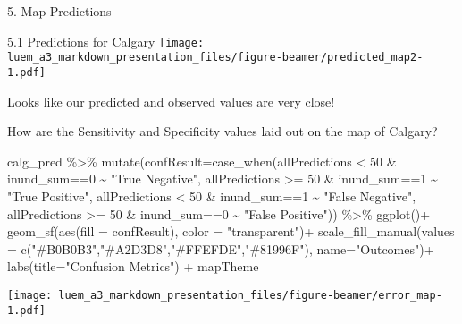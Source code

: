 \documentclass[
  ignorenonframetext,
]{beamer}
\newenvironment{Shaded}{\begin{snugshade}}{\end{snugshade}}
\newcommand{\AttributeTok}[1]{\textcolor[rgb]{0.77,0.63,0.00}{#1}}
\newcommand{\DecValTok}[1]{\textcolor[rgb]{0.00,0.00,0.81}{#1}}
\newcommand{\FunctionTok}[1]{\textcolor[rgb]{0.00,0.00,0.00}{#1}}
\newcommand{\NormalTok}[1]{#1}
\newcommand{\SpecialCharTok}[1]{\textcolor[rgb]{0.00,0.00,0.00}{#1}}
\newcommand{\StringTok}[1]{\textcolor[rgb]{0.31,0.60,0.02}{#1}}
\begin{document}
\begin{frame}[fragile]{5. Map Predictions}
\begin{block}{5.1 Predictions for Calgary}
\texttt{[image: luem\_a3\_markdown\_presentation\_files/figure-beamer/predicted\_map2-1.pdf]}

Looks like our predicted and observed values are very close!

How are the Sensitivity and Specificity values laid out on the map of
Calgary?

\begin{Shaded}
\begin{Highlighting}[]
\NormalTok{calg\_pred }\SpecialCharTok{\%\textgreater{}\%}
  \FunctionTok{mutate}\NormalTok{(}\AttributeTok{confResult=}\FunctionTok{case\_when}\NormalTok{(allPredictions }\SpecialCharTok{\textless{}} \DecValTok{50} \SpecialCharTok{\&}\NormalTok{ inund\_sum}\SpecialCharTok{==}\DecValTok{0} \SpecialCharTok{\textasciitilde{}} \StringTok{"True Negative"}\NormalTok{,}
\NormalTok{                              allPredictions }\SpecialCharTok{\textgreater{}=} \DecValTok{50} \SpecialCharTok{\&}\NormalTok{ inund\_sum}\SpecialCharTok{==}\DecValTok{1} \SpecialCharTok{\textasciitilde{}} \StringTok{"True Positive"}\NormalTok{,}
\NormalTok{                              allPredictions }\SpecialCharTok{\textless{}} \DecValTok{50} \SpecialCharTok{\&}\NormalTok{ inund\_sum}\SpecialCharTok{==}\DecValTok{1} \SpecialCharTok{\textasciitilde{}} \StringTok{"False Negative"}\NormalTok{,}
\NormalTok{                              allPredictions }\SpecialCharTok{\textgreater{}=} \DecValTok{50} \SpecialCharTok{\&}\NormalTok{ inund\_sum}\SpecialCharTok{==}\DecValTok{0} \SpecialCharTok{\textasciitilde{}} \StringTok{"False Positive"}\NormalTok{)) }\SpecialCharTok{\%\textgreater{}\%}
  \FunctionTok{ggplot}\NormalTok{()}\SpecialCharTok{+}
  \FunctionTok{geom\_sf}\NormalTok{(}\FunctionTok{aes}\NormalTok{(}\AttributeTok{fill =}\NormalTok{ confResult), }\AttributeTok{color =} \StringTok{"transparent"}\NormalTok{)}\SpecialCharTok{+}
  \FunctionTok{scale\_fill\_manual}\NormalTok{(}\AttributeTok{values =} \FunctionTok{c}\NormalTok{(}\StringTok{"\#B0B0B3"}\NormalTok{,}\StringTok{"\#A2D3D8"}\NormalTok{,}\StringTok{"\#FFEFDE"}\NormalTok{,}\StringTok{"\#81996F"}\NormalTok{),}
                    \AttributeTok{name=}\StringTok{"Outcomes"}\NormalTok{)}\SpecialCharTok{+}
  \FunctionTok{labs}\NormalTok{(}\AttributeTok{title=}\StringTok{"Confusion Metrics"}\NormalTok{) }\SpecialCharTok{+}
\NormalTok{  mapTheme}
\end{Highlighting}
\end{Shaded}

\texttt{[image: luem\_a3\_markdown\_presentation\_files/figure-beamer/error\_map-1.pdf]}


\end{block}
\end{frame}
\end{document}
